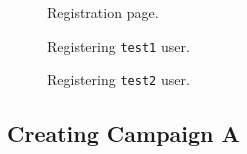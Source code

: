 \documentclass{article}
\begin{document}
		\begin{figure}[ht]
			\centering
			\caption{Registration page.}
			\label{fig:eval-prep-2}
		\end{figure}

		\begin{figure}[ht]
			\centering
			\caption{Registering \texttt{test1} user.}
			\label{fig:eval-prep-3}
		\end{figure}

		\begin{figure}[ht]
			\centering
			\caption{Registering \texttt{test2} user.}
			\label{fig:eval-prep-4}
		\end{figure}

		\FloatBarrier
		\subsection{Creating Campaign A}
\end{document}
